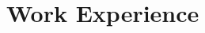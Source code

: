 \documentclass[a4,10pt]{article}
\newcommand{\hskills}[1]{
\textbf{\bfseries #1} }
\begin{document}
    


\section{Work Experience}
\end{document}
